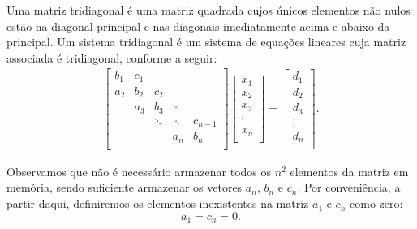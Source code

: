 Uma matriz tridiagonal é uma matriz quadrada cujos únicos elementos não nulos estão na diagonal principal e nas diagonais imediatamente acima e abaixo da principal. Um sistema tridiagonal é um sistema de equações lineares cuja matriz associada é tridiagonal, conforme a seguir:
\begin{eqnarray}\label{linsis:EqTriDiag} \begin{bmatrix}
   {b_1} & {c_1} & {   } & {   } & {   } \\
   {a_2} & {b_2} & {c_2} & {   } & {   } \\
   {   } & {a_3} & {b_3} & \ddots & {   } \\
   {   } & {   } & \ddots & \ddots & {c_{n-1}}\\
   {   } & {   } & {   } & {a_n} & {b_n}\\
\end{bmatrix}
\begin{bmatrix}
   {x_1 }  \\
   {x_2 }  \\
   {x_3 }  \\
   \vdots   \\
   {x_n }  \\
\end{bmatrix}
=
\begin{bmatrix}
   {d_1 }  \\
   {d_2 }  \\
   {d_3 }  \\
   \vdots   \\
   {d_n }  \\
\end{bmatrix}
.
\end{eqnarray}

Observamos que não é necessário armazenar todos os $n^2$ elementos da matriz em memória, sendo suficiente armazenar os vetores $a_n$, $b_n$ e $c_n$. Por conveniência, a partir daqui, definiremos os elementos inexistentes na matriz $a_1$ e $c_n$ como zero:
$$a_1=c_n=0.$$

